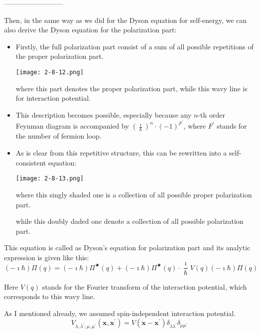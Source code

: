 \begin{center}--------------------------\end{center}

Then, in the same way as we did for the Dyson equation for self-energy, we can also derive the Dyson equation for the polarization part:

\begin{itemize}
\item Firstly, the full polarization part consist of a sum of all possible repetitions of the proper polarization part.
\begin{center} \label{Fig2.8.12}
\texttt{[image: 2-8-12.png]}
\end{center}

where this part denotes the proper polarization part, while this wavy line is for interaction potential.

\item This description becomes possible, especially because any $n$-th order Feynman diagram is accompanied by $\left( \frac{\imath}{\hbar} \right)^n \cdot (-1)^{F^{'}}$, where $F^{'}$ stands for the number of fermion loop.

\item As is clear from this repetitive structure, this can be rewritten into a self-consistent equation:
\begin{center} \label{Fig2.8.13}
\texttt{[image: 2-8-13.png]}
\end{center}

where this singly shaded one is a collection of all possible proper polarization part.

while this doubly daded one denote a collection of all possible polarization part.
\end{itemize}

This equation is called as Dyson's equation for polarization part and its analytic expression is given like this:
\[(-\imath \hbar)\Pi(q) = (-\imath \hbar)\Pi^{\bigstar}(q)+(-\imath \hbar)\Pi^{\bigstar}(q) \cdot \frac{\imath}{\hbar} V(q) (-\imath\hbar)\Pi(q)\]

Here $V(q)$ stands for the Fourier transform of the interaction potential, which corresponds to this wavy line.

As I mentioned already, we assumed spin-independent interaction potential.
\[V_{\lambda,\lambda^{'};\mu,\mu^{'}}(\mathbf{x},\mathbf{x}^{'}) = V(\mathbf{x}-\mathbf{x}^{'}) \delta_{\lambda\lambda^{'}}\delta_{\mu\mu^{'}}\]

